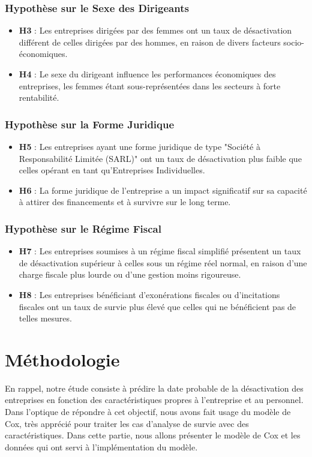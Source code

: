 \documentclass[a4paper,12pt]{report}
\renewcommand\thesection{\Roman{section}}
\begin{document}
\subsection{Hypothèse sur le Sexe des Dirigeants}
\begin{itemize}
    \item \textbf{H3} : Les entreprises dirigées par des femmes ont un taux de désactivation différent de celles dirigées par des hommes, en raison de divers facteurs socio-économiques.
    \item \textbf{H4} : Le sexe du dirigeant influence les performances économiques des entreprises, les femmes étant sous-représentées dans les secteurs à forte rentabilité.
\end{itemize}

\subsection{Hypothèse sur la Forme Juridique}
\begin{itemize}
    \item \textbf{H5} : Les entreprises ayant une forme juridique de type "Société à Responsabilité Limitée (SARL)" ont un taux de désactivation plus faible que celles opérant en tant qu'Entreprises Individuelles.
    \item \textbf{H6} : La forme juridique de l'entreprise a un impact significatif sur sa capacité à attirer des financements et à survivre sur le long terme.
\end{itemize}

\subsection{Hypothèse sur le Régime Fiscal}
\begin{itemize}
    \item \textbf{H7} : Les entreprises soumises à un régime fiscal simplifié présentent un taux de désactivation supérieur à celles sous un régime réel normal, en raison d'une charge fiscale plus lourde ou d'une gestion moins rigoureuse.
    \item \textbf{H8} : Les entreprises bénéficiant d'exonérations fiscales ou d'incitations fiscales ont un taux de survie plus élevé que celles qui ne bénéficient pas de telles mesures.
\end{itemize}

 
\chapter{Méthodologie}
\setcounter{section}{0}  %
\renewcommand\thesection{\Roman{section}} 
En rappel, notre étude consiste à prédire la date probable de la désactivation des entreprises en fonction des caractéristiques propres à l’entreprise et au personnel. Dans l’optique de répondre à cet objectif, nous avons fait usage du modèle de Cox, très apprécié pour traiter les cas d’analyse de survie avec des caractéristiques.
Dans cette partie, nous allons présenter le modèle de Cox et les données qui ont servi à l’implémentation du modèle.
\end{document}
